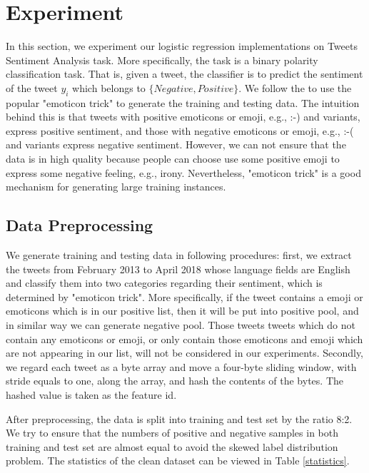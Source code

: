 \documentclass[sigconf]{acmart}
\begin{document}
\section{Experiment}
In this section, we experiment our logistic regression implementations on Tweets Sentiment Analysis task. More specifically, the task is a binary polarity classification task. That is, given a tweet, the classifier is to predict the sentiment of the tweet $y_i$ which belongs to $\{Negative, Positive\}$. We follow the \cite{lin2012large} to use the popular "emoticon trick" to generate the training and testing data. The intuition behind this is that tweets with positive emoticons or emoji, e.g., :-) and variants, express positive sentiment, and those with negative emoticons or emoji, e.g., :-( and variants express negative sentiment. However, we can not ensure that the data is in high quality because people can choose use some positive emoji to express some negative feeling, e.g., irony. Nevertheless, "emoticon trick" is a good mechanism for generating large training instances.

\subsection{Data Preprocessing}
\label{subsection:dataProcessing}

We generate training and testing data in following procedures: first, we extract the tweets from February 2013 to April 2018 whose language fields are English and classify them into two categories regarding their sentiment, which is determined by "emoticon trick". More specifically, if the tweet contains a emoji or emoticons which is in our positive list, then it will be put into positive pool, and in similar way we can generate negative pool. Those tweets tweets which do not contain any emoticons or emoji, or only contain those emoticons and emoji which are not appearing in our list, will not be considered in our experiments. Secondly, we regard each tweet as a byte array and move a four-byte sliding window, with stride equals to one, along the array, and hash the contents of the bytes. The hashed value is taken as the feature id. 

After preprocessing, the  data is split into training and test set by the ratio 8:2. We try to ensure that the numbers of positive and negative samples in both training and test set are almost equal to avoid the skewed label distribution problem. The statistics of the clean dataset can be viewed in Table \ref{statistics}.
\end{document}

